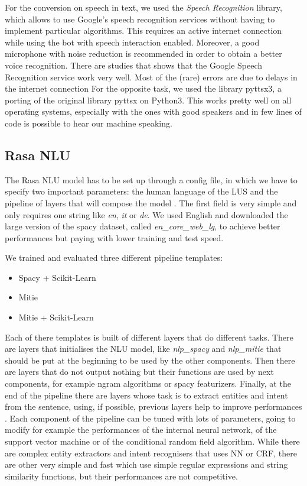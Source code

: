 \documentclass[11pt,a4paper]{article}
\begin{document}
For the conversion on speech in text, we used the \textit{Speech Recognition} library, which allows to use Google's speech recognition services without having to implement particular algorithms. This requires an active internet connection while using the bot with speech interaction enabled. Moreover, a good microphone with noise reduction is recommended in order to obtain a better voice recognition.
There are studies that shows that the Google Speech Recognition service work very well. Most of the (rare) errors are due to delays in the internet connection \cite{speech_study}
For the opposite task, we used the library pyttsx3, a porting of the original library pyttsx on Python3. This works pretty well on all operating systems, especially with the ones with good speakers and in few lines of code is possible to hear our machine speaking.

\subsection{Rasa NLU}

The Rasa NLU model has to be set up through a config file, in which we have to specify two important parameters: the human language of the LUS and the pipeline of layers that will compose the model \cite{rasa_nlu}. The first field is very simple and only requires one string like \textit{en}, \textit{it} or \textit{de}. We used English and downloaded the large version of the spacy dataset, called \textit{en\_core\_web\_lg}, to achieve better performances but paying with lower training and test speed.

We trained and evaluated three different pipeline templates: 
\begin{itemize}
\item Spacy + Scikit-Learn
\item Mitie
\item Mitie + Scikit-Learn
\end{itemize}

Each of there templates is built of different layers that do different tasks. There are layers that initialises the NLU model, like \textit{nlp\_spacy} and \textit{nlp\_mitie} that should be put at the beginning to be used by the other components. Then there are layers that do not output nothing but their functions are used by next components, for example ngram algorithms or spacy featurizers. Finally, at the end of the pipeline there are layers whose task is to extract entities and intent from the sentence, using, if possible, previous layers help to improve performances \cite{pipeline}.
Each component of the pipeline can be tuned with lots of parameters, going to modify for example the performances of the internal neural network, of the support vector machine or of the conditional random field algorithm. While there are complex entity extractors and intent recognisers that uses NN or CRF, there are other very simple and fast which use simple regular expressions and string similarity functions, but their performances are not competitive.
\end{document}
